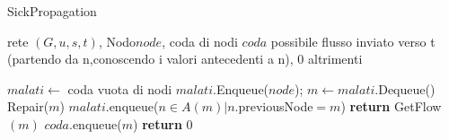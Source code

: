 \documentclass{article}
\begin{document}
\begin{algorithm}
    \caption{SickPropagation}
    \begin{algorithmic}
        \REQUIRE rete $(G,u,s,t)$, Nodo$ node$, coda di nodi $coda$
        \ENSURE possibile flusso inviato verso t (partendo da n,conoscendo i valori antecedenti a n), 0 altrimenti

        \STATE $malati \leftarrow$ coda vuota di nodi
        \STATE $malati$.Enqueue($node$);
        \STATE $m \leftarrow malati$.Dequeue()
        \STATE Repair($m$)
        \STATE $malati$.enqueue($n \in A(m) |  n.$previousNode$ = m$) 
        \STATE \textbf{return} GetFlow$(m)$
        \ELSE
        \STATE $coda$.enqueue($m$)
        \ENDIF
        \ENDWHILE
        \STATE \textbf{return} 0
    \end{algorithmic}
\end{algorithm}
\end{document}
